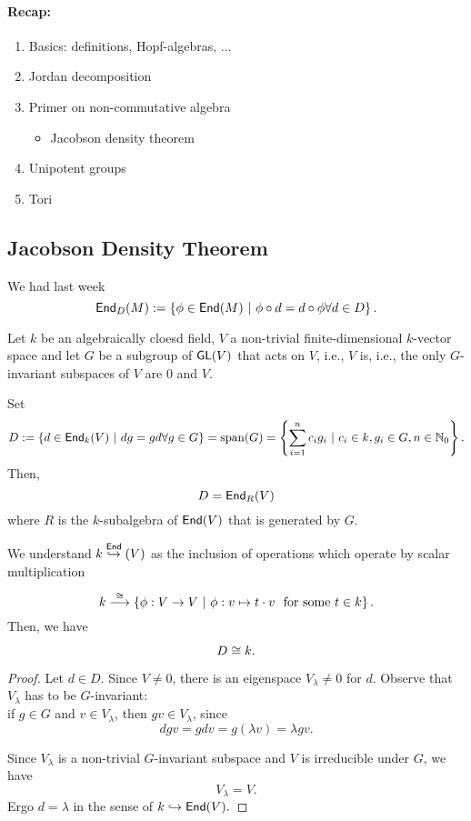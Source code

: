\paragraph{Recap:}
\begin{enumerate}[--]
	\item Basics: definitions, Hopf-algebras, ...	
	\item	Jordan decomposition
	\item	Primer on non-commutative algebra
	\begin{itemize}
		\item 	Jacobson density theorem
	\end{itemize}
	\item Unipotent groups
	\item Tori
\end{enumerate}

\subsection{Jacobson Density Theorem}
We had last week
\[ \textsf{End}_D(M) := \left\lbrace\phi \in \textsf{End}(M) ~ | ~ \phi \circ d = d \circ \phi \forall d\in D\right\rbrace. \]

Let $k$ be an algebraically cloesd field, $V$ a non-trivial finite-dimensional $k$-vector space and let $G$ be a subgroup of $\textsf{GL}(V)$ that acts  on $V$, i.e.,
$V$ is, i.e., the only $G$-invariant subspaces of $V$ are ${0}$ and $V$.

Set
\[ D:= \left\lbrace d \in \textsf{End}_k(V) ~ | ~  dg = gd \forall g \in G \right\rbrace = \mathrm{span}(G) = \left\lbrace\sum_{i = 1}^nc_i g_i ~ | ~ c_i \in k, g_i \in G, n \in \mathbb{N}_0\right\rbrace.\]
Then,
\[D = \textsf{End}_R(V) \]
where $R$ is the $k$-subalgebra of $\textsf{End}(V)$ that is generated by $G$.

\begin{lemma}
We understand $k \overset{\textsf{End}}{\hookrightarrow}(V)$ as the inclusion of operations which operate by scalar multiplication
\[ k \overset{\overset{}{\cong}}{\longrightarrow} \left\lbrace\phi : V \overset{}{\rightarrow} V ~ | ~ \phi : v\mapsto t \cdot v ~~ \text{for some } t \in k\right\rbrace. \]
Then, we have
\[ D \overset{}{\cong} k.\]
\end{lemma}
\begin{proof}
Let $d \in D$. Since $V \neq 0$, there is an eigenspace $V_\lambda\neq 0$ for $d$. Observe that $V_\lambda$ has to be $G$-invariant:\\
if $g \in G$ and $v \in V_\lambda$, then $gv \in V_\lambda$, since
\[ dgv = gdv = g(\lambda v) = \lambda gv. \]

Since $V_\lambda$ is a non-trivial $G$-invariant subspace and $V$ is irreducible under $G$, we have
\[ V_\lambda = V.\]
Ergo $d = \lambda$ in the sense of $k \overset{}{\hookrightarrow} \textsf{End}(V).$
\end{proof}

